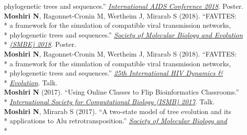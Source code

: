 \documentclass[margin,line]{res}
\begin{document}
\begin{resume}
\hspace*{8.5mm} phylogenetic trees and sequences.'' \href{https://www.aids2018.org/}{\textit{International AIDS Conference 2018}}. Poster.\\
\hspace*{4mm} \textbf{Moshiri N}, Ragonnet-Cronin M, Wertheim J, Mirarab S (2018). ``FAVITES:\\*
\hspace*{9.5mm} a framework for the simulation of compatible viral transmission networks,\\*
\hspace*{9.5mm} phylogenetic trees and sequences.'' \href{https://smbe.org/smbe/SMBE2018Meeting/}{\textit{Society of Molecular Biology and Evolution}}\\*\vspace{2mm}
\hspace*{8mm} \href{https://smbe.org/smbe/SMBE2018Meeting/}{\textit{(SMBE) 2018}}. Poster.\\
\hspace*{4mm} \textbf{Moshiri N}, Ragonnet-Cronin M, Wertheim J, Mirarab S (2018). ``FAVITES:\\*
\hspace*{9.5mm} a framework for the simulation of compatible viral transmission networks,\\*
\hspace*{9.5mm} phylogenetic trees and sequences.'' \href{https://cme.ucsd.edu/hivdynamics/}{\textit{25th International HIV Dynamics \&}}\\*\vspace{2mm}
\hspace*{8mm} \href{https://cme.ucsd.edu/hivdynamics/}{\textit{Evolution}}. Talk.\\
\hspace*{4mm} \textbf{Moshiri N} (2017). ``Using Online Classes to Flip Bioinformatics Classrooms.''\\*\vspace{2mm}
\hspace*{8mm} \href{https://www.iscb.org/cms_addon/conferences/ismbeccb2017/technologytrack.php}{\textit{International Society for Computational Biology (ISMB) 2017}}. Talk.\\
\hspace*{4mm} \textbf{Moshiri N}, Mirarab S (2017). ``A two-state model of tree evolution and its\\*
\hspace*{9.5mm} applications to Alu retrotransposition.'' \href{https://smbe.org/smbe/}{\textit{Society of Molecular Biology and}}\\*\vspace{2mm}

\end{resume}
\end{document}

